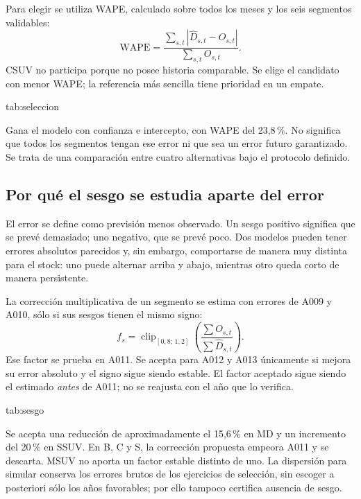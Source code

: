 Para elegir se utiliza WAPE, calculado sobre todos los meses y los seis segmentos
validables:
\begin{equation}\label{eq:wape}
 \mathrm{WAPE}=\frac{\sum_{s,t}|\widehat D_{s,t}-O_{s,t}|}
                         {\sum_{s,t}O_{s,t}}.
\end{equation}
CSUV no participa porque no posee historia comparable. Se elige el candidato con
menor WAPE; la referencia más sencilla tiene prioridad en un empate.

{tab:seleccion}{}

Gana el modelo con confianza e intercepto, con WAPE del 23,8\,\%. No significa
que todos los segmentos tengan ese error ni que sea un error futuro garantizado.
Se trata de una comparación entre cuatro alternativas bajo el protocolo definido.

\subsection{Por qué el sesgo se estudia aparte del error}
El error se define como previsión menos observado. Un sesgo positivo significa
que se prevé demasiado; uno negativo, que se prevé poco. Dos modelos pueden
tener errores absolutos parecidos y, sin embargo, comportarse de manera muy
distinta para el stock: uno puede alternar arriba y abajo, mientras otro queda
corto de manera persistente.

La corrección multiplicativa de un segmento se estima con errores de A009 y
A010, sólo si sus sesgos tienen el mismo signo:
\begin{equation}
 f_s=\operatorname{clip}_{[0{,}8;\,1{,}2]}
 \left(\frac{\sum O_{s,t}}{\sum\widehat D_{s,t}}\right).
\end{equation}
Ese factor se prueba en A011. Se acepta para A012 y A013 únicamente si mejora
su error absoluto y el signo sigue siendo estable. El factor aceptado sigue
siendo el estimado \emph{antes} de A011; no se reajusta con el año que lo verifica.

{tab:sesgo}{}

Se acepta una reducción de aproximadamente el 15,6\,\% en MD y un incremento
del 20\,\% en SSUV. En B, C y S, la corrección propuesta empeora A011 y se
descarta. MSUV no aporta un factor estable distinto de uno. La dispersión para
simular conserva los errores brutos de los ejercicios de selección, sin escoger
a posteriori sólo los años favorables; por ello tampoco certifica ausencia de sesgo.

